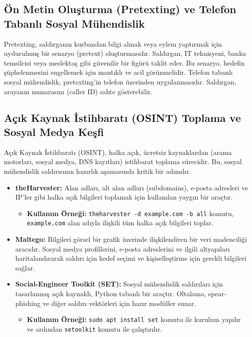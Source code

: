 \subsection{Ön Metin Oluşturma (Pretexting) ve Telefon Tabanlı Sosyal Mühendislik}

Pretexting, saldırganın kurbandan bilgi almak veya eylem yaptırmak için uydurulmuş bir senaryo (pretext) oluşturmasıdır. Saldırgan, IT teknisyeni, banka temsilcisi veya meslektaş gibi güvenilir bir figürü taklit eder. Bu senaryo, hedefin şüphelenmesini engellemek için mantıklı ve acil görünmelidir. Telefon tabanlı sosyal mühendislik, pretexting'in telefon üzerinden uygulanmasıdır. Saldırgan, arayanın numarasını (caller ID) sahte gösterebilir.

\subsection{Açık Kaynak İstihbaratı (OSINT) Toplama ve Sosyal Medya Keşfi}

Açık Kaynak İstihbaratı (OSINT), halka açık, ücretsiz kaynaklardan (arama motorları, sosyal medya, DNS kayıtları) istihbarat toplama sürecidir. Bu, sosyal mühendislik saldırısının hazırlık aşamasında kritik bir adımdır.
\begin{itemize}
    \item \textbf{theHarvester:} Alan adları, alt alan adları (subdomains), e-posta adresleri ve IP'ler gibi halka açık bilgileri toplamak için kullanılan yaygın bir araçtır.
    \begin{itemize}
        \item \textbf{Kullanım Örneği:} \verb|theharvester -d example.com -b all| komutu, \verb|example.com| alan adıyla ilişkili tüm halka açık bilgileri toplar.
    \end{itemize}
    \item \textbf{Maltego:} Bilgileri görsel bir grafik üzerinde ilişkilendiren bir veri madenciliği aracıdır. Sosyal medya profillerini, e-posta adreslerini ve ilgili altyapıları haritalandırarak saldırı için hedef seçimi ve kişiselleştirme için gerekli bilgileri sağlar.
    \item \textbf{Social-Engineer Toolkit (SET):} Sosyal mühendislik saldırıları için tasarlanmış açık kaynaklı, Python tabanlı bir araçtır. Oltalama, spear-phishing ve diğer saldırı vektörleri için hazır modüller sunar.
    \begin{itemize}
        \item \textbf{Kullanım Örneği:} \verb|sudo apt install set| komutu ile kurulum yapılır ve ardından \verb|setoolkit| komutu ile çalıştırılır.
    \end{itemize}
\end{itemize}

